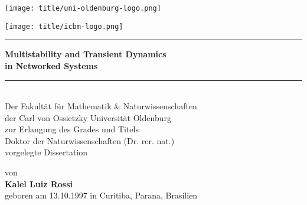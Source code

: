 \begin{titlepage}
    \centering
    \begin{minipage}{0.4\textwidth}
        \centering
        \texttt{[image: title/uni-oldenburg-logo.png]}  %
    \end{minipage}
    \hfill
    \begin{minipage}{0.4\textwidth}
        \centering
        \texttt{[image: title/icbm-logo.png]}  %
    \end{minipage}
    
    \vspace*{2.0cm}
    {
        \noindent\rule{\textwidth}{0.4mm}  %
    \vspace{0.4cm}
    \huge \textbf{Multistability and Transient Dynamics \\[0.25cm] in Networked Systems}
    \vspace{0.4cm}
    \noindent\rule{\textwidth}{0.4mm}  %
    }
    \\[2.2cm]  %
    
    
    \vspace*{2.8cm}  %
    {\large Der Fakultät für Mathematik \& Naturwissenschaften \\[0.25cm]
    der Carl von Ossietzky Universität Oldenburg \\[0.25cm]
    zur Erlangung des Grades und Titels \\[0.25cm]
    Doktor der Naturwissenschaften (Dr. rer. nat.) \\[0.25cm]
    vorgelegte Dissertation}
    
	\vfill
    {\large von \\[0.28cm]
    \textbf{Kalel Luiz Rossi} \\[0.28cm]
    geboren am 13.10.1997 in Curitiba, Parana, Brasilien}
    
    
\end{titlepage}


